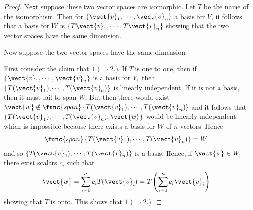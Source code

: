 \begin{proof}
Next suppose these two vector spaces are isomorphic. Let $T$ be the name of
the isomorphism. Then for $\left\{ \vect{v}_{1},\cdots ,\vect{v}_{n}\right\} $
a basis for $V$, it follows that a basis for $W$
is $\left\{ T\vect{v}_{1},\cdots ,T\vect{v}_{n}\right\} $ showing that the two
vector spaces have the same dimension.

Now suppose the two vector spaces have the same dimension.

First consider the claim that $1.)\Rightarrow 2.).$ If $T$ is one to one,
then if $\left\{ \vect{v}_{1},\cdots ,\vect{v}
_{n}\right\} $ is a basis for $V,$ then $\left\{ T(\vect{v}_{1}),\cdots ,T(\vect{v
}_{n})\right\} $ is linearly independent. If it is not a basis, then it must
fail to span $W$. But then there would exist $\vect{w}\notin \func{span}
\left\{ T(\vect{v}_{1}),\cdots ,T(\vect{v}_{n})\right\} $ and it follows that $
\left\{ T(\vect{v}_{1}),\cdots ,T(\vect{v}_{n}),\vect{w}\right\} $ would be
linearly independent which is impossible because there exists a basis for $W$
of $n$ vectors. Hence 
\[
\func{span}\left\{ T(\vect{v}_{1}),\cdots ,T(\vect{v}
_{n})\right\} =W
\]
and so $\left\{ T(\vect{v}_{1}),\cdots ,T(\vect{v}_{n})\right\} $
is a basis. Hence, if $\vect{w}\in W,$ there exist scalars $c_{i}$ such that 
\begin{equation*}
\vect{w}=\sum_{i=1}^{n}c_{i}T(\vect{v}_{i})=T\left( \sum_{i=1}^{n}c_{i}\vect{v}
_{i}\right)
\end{equation*}
showing that $T$ is onto. This shows that $1.)\Rightarrow 2.).$


\end{proof}
